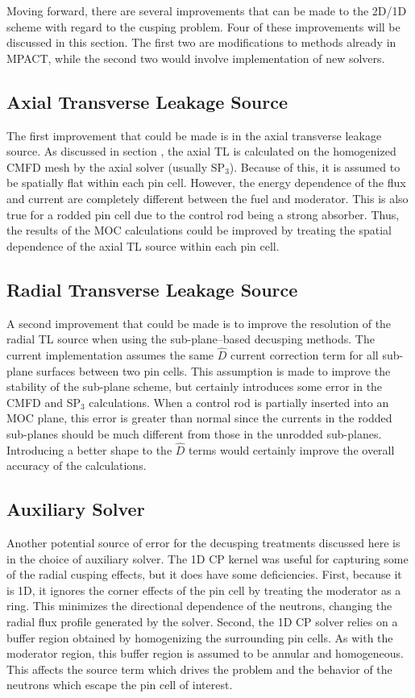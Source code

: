 Moving forward, there are several improvements that can be made to the 2D/1D scheme with regard to the cusping problem.  Four of these improvements will be discussed in this section.  The first two are modifications to methods already in MPACT, while the second two would involve implementation of new solvers.

\subsection{Axial Transverse Leakage Source}

The first improvement that could be made is in the axial transverse leakage source.  As discussed in section , the axial TL is calculated on the homogenized CMFD mesh by the axial solver (usually SP$_3$).  Because of this, it is assumed to be spatially flat within each pin cell.  However, the energy dependence of the flux and current are completely different between the fuel and moderator.  This is also true for a rodded pin cell due to the control rod being a strong absorber.  Thus, the results of the MOC calculations could be improved by treating the spatial dependence of the axial TL source within each pin cell.  

\subsection{Radial Transverse Leakage Source}

A second improvement that could be made is to improve the resolution of the radial TL source when using the sub-plane--based decusping methods.  The current implementation assumes the same $\hat{D}$ current correction term for all sub-plane surfaces between two pin cells.  This assumption is made to improve the stability of the sub-plane scheme, but certainly introduces some error in the CMFD and SP$_3$ calculations.  When a control rod is partially inserted into an MOC plane, this error is greater than normal since the currents in the rodded sub-planes should be much different from those in the unrodded sub-planes.  Introducing a better shape to the $\hat{D}$ terms would certainly improve the overall accuracy of the calculations.

\subsection{Auxiliary Solver}

Another potential source of error for the decusping treatments discussed here is in the choice of auxiliary solver.  The 1D CP kernel was useful for capturing some of the radial cusping effects, but it does have some deficiencies.  First, because it is 1D, it ignores the corner effects of the pin cell by treating the moderator as a ring.  This minimizes the directional dependence of the neutrons, changing the radial flux profile generated by the solver.  Second, the 1D CP solver relies on a buffer region obtained by homogenizing the surrounding pin cells.  As with the moderator region, this buffer region is assumed to be annular and homogeneous.  This affects the source term which drives the problem and the behavior of the neutrons which escape the pin cell of interest.

